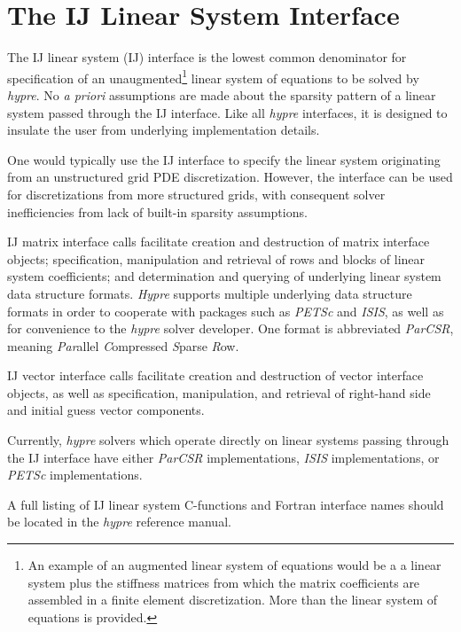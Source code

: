 \chapter{The IJ Linear System Interface}
\label{IJ}

The IJ linear system (IJ) interface is the lowest common
denominator for specification of an 
unaugmented\footnote{An example of an augmented
linear system of equations would be a 
a linear system plus the stiffness matrices from which the matrix
coefficients are assembled in a finite element discretization.
More than the linear system of equations is provided.}
linear system of equations to be solved by {\slshape hypre}.
No {\itshape a priori} assumptions are made about the sparsity
pattern of a linear system passed through the IJ interface.
Like all {\slshape hypre} interfaces, it is designed
to insulate the user from underlying implementation details.

One would typically use the IJ interface to specify the linear
system originating from an unstructured grid PDE discretization.
However, the interface can be used for discretizations from more
structured grids, with consequent solver inefficiencies from lack
of built-in sparsity assumptions.

IJ matrix interface calls facilitate creation and destruction of 
matrix interface objects; specification, manipulation and retrieval
of rows and blocks of linear system coefficients; and determination
and querying of underlying linear system data structure formats.
{\slshape Hypre} supports multiple underlying data structure formats
in order to cooperate
with packages such as {\slshape PETSc} and {\slshape ISIS},
as well as for convenience to the {\slshape hypre} solver developer.
One format is abbreviated {\itshape ParCSR}, meaning {\itshape Par}allel
{\itshape C}ompressed {\itshape S}parse {\itshape R}ow.

IJ vector interface calls facilitate creation and destruction of
vector interface objects, as well as specification, manipulation,
and retrieval of right-hand side and initial guess vector components.

Currently, {\slshape hypre} solvers which operate directly on linear
systems passing through the IJ interface have either
{\itshape ParCSR} implementations, {\slshape ISIS} implementations,
or {\slshape PETSc} implementations.

A full listing of IJ linear system C-functions and Fortran
interface names should be located in the {\slshape hypre} reference
manual.

